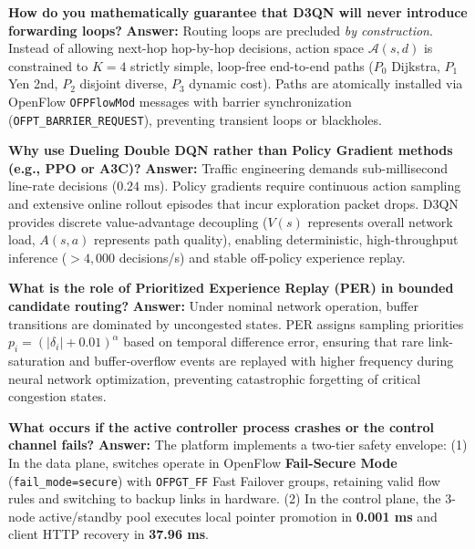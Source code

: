 \documentclass[10pt,a4paper]{article}
\newcommand{\code}[1]{\texttt{#1}}
\begin{document}
\begin{description}[leftmargin=!,labelwidth=7mm,itemsep=1.2pt]
  \footnotesize
  \item[\textbf{Q1:}] \textbf{How do you mathematically guarantee that D3QN will never introduce forwarding loops?}
  \textbf{Answer:} Routing loops are precluded \emph{by construction}. Instead of allowing next-hop hop-by-hop decisions, action space $\mathcal{A}(s,d)$ is constrained to $K=4$ strictly simple, loop-free end-to-end paths ($P_0$ Dijkstra, $P_1$ Yen 2nd, $P_2$ disjoint diverse, $P_3$ dynamic cost). Paths are atomically installed via OpenFlow \code{OFPFlowMod} messages with barrier synchronization (\code{OFPT\_BARRIER\_REQUEST}), preventing transient loops or blackholes.

  \item[\textbf{Q2:}] \textbf{Why use Dueling Double DQN rather than Policy Gradient methods (e.g., PPO or A3C)?}
  \textbf{Answer:} Traffic engineering demands sub-millisecond line-rate decisions ($0.24\text{ ms}$). Policy gradients require continuous action sampling and extensive online rollout episodes that incur exploration packet drops. D3QN provides discrete value-advantage decoupling ($V(s)$ represents overall network load, $A(s,a)$ represents path quality), enabling deterministic, high-throughput inference ($>4{,}000$ decisions/s) and stable off-policy experience replay.

  \item[\textbf{Q3:}] \textbf{What is the role of Prioritized Experience Replay (PER) in bounded candidate routing?}
  \textbf{Answer:} Under nominal network operation, buffer transitions are dominated by uncongested states. PER assigns sampling priorities $p_i = (|\delta_i| + 0.01)^\alpha$ based on temporal difference error, ensuring that rare link-saturation and buffer-overflow events are replayed with higher frequency during neural network optimization, preventing catastrophic forgetting of critical congestion states.

  \item[\textbf{Q4:}] \textbf{What occurs if the active controller process crashes or the control channel fails?}
  \textbf{Answer:} The platform implements a two-tier safety envelope: (1) In the data plane, switches operate in OpenFlow \textbf{Fail-Secure Mode} (\code{fail\_mode=secure}) with \code{OFPGT\_FF} Fast Failover groups, retaining valid flow rules and switching to backup links in hardware. (2) In the control plane, the 3-node active/standby pool executes local pointer promotion in \textbf{0.001 ms} and client HTTP recovery in \textbf{37.96 ms}.
\end{description}
\end{document}
